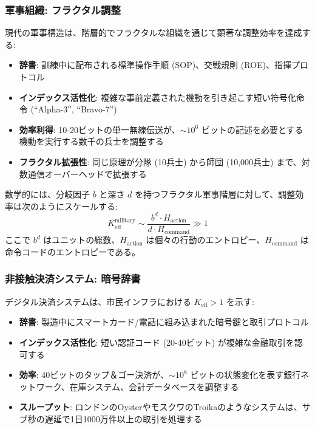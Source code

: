 \documentclass[11pt,a4paper]{article}
\begin{document}
	\subsubsection{軍事組織: フラクタル調整}
	現代の軍事構造は、階層的でフラクタルな組織を通じて顕著な調整効率を達成する:
	\begin{itemize}
		\item \textbf{辞書}: 訓練中に配布される標準操作手順 (SOP)、交戦規則 (ROE)、指揮プロトコル
		\item \textbf{インデックス活性化}: 複雑な事前定義された機動を引き起こす短い符号化命令 (``Alpha-3'', ``Bravo-7'')
		\item \textbf{効率利得}: 10-20ビットの単一無線伝送が、$\sim 10^6$ ビットの記述を必要とする機動を実行する数千の兵士を調整する
		\item \textbf{フラクタル拡張性}: 同じ原理が分隊 (10兵士) から師団 (10,000兵士) まで、対数通信オーバーヘッドで拡張する
	\end{itemize}
	
	数学的には、分岐因子 $b$ と深さ $d$ を持つフラクタル軍事階層に対して、調整効率は次のようにスケールする:
	\begin{equation}
		K_{\mathrm{eff}}^{\text{military}} \sim \frac{b^d \cdot H_{\text{action}}}{d \cdot H_{\text{command}}} \gg 1
	\end{equation}
	ここで $b^d$ はユニットの総数、$H_{\text{action}}$ は個々の行動のエントロピー、$H_{\text{command}}$ は命令コードのエントロピーである。
	
	\subsubsection{非接触決済システム: 暗号辞書}
	デジタル決済システムは、市民インフラにおける $K_{\mathrm{eff}} > 1$ を示す:
	\begin{itemize}
		\item \textbf{辞書}: 製造中にスマートカード/電話に組み込まれた暗号鍵と取引プロトコル
		\item \textbf{インデックス活性化}: 短い認証コード (20-40ビット) が複雑な金融取引を認可する
		\item \textbf{効率}: 40ビットのタップ＆ゴー決済が、$\sim 10^8$ ビットの状態変化を表す銀行ネットワーク、在庫システム、会計データベースを調整する
		\item \textbf{スループット}: ロンドンのOysterやモスクワのTroikaのようなシステムは、サブ秒の遅延で1日1000万件以上の取引を処理する
	\end{itemize}
	
\end{document}
